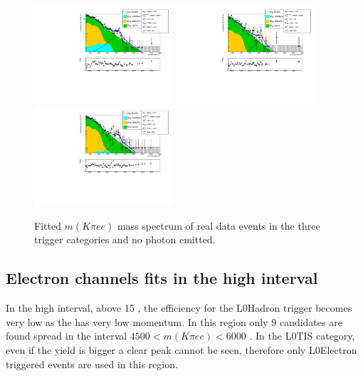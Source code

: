 \begin{figure}[h!]
\centering
\includegraphics[width=0.46\textwidth]{RKst/figs/fit_EEs_0_EE-q2central-gmc/KstEE_L0E_log_fitAndRes.pdf}
\includegraphics[width=0.46\textwidth]{RKst/figs/fit_EEs_0_EE-q2central-gmc/KstEE_L0H_log_fitAndRes.pdf}
\includegraphics[width=0.46\textwidth]{RKst/figs/fit_EEs_0_EE-q2central-gmc/KstEE_L0I_log_fitAndRes.pdf}
\caption{Fitted $m(K\pi ee)$ mass spectrum of \BdKstee real data events in the three trigger categories and no photon emitted. }
\label{fig:FitEE_Data_inTrigCat}
\end{figure}


\subsection{Electron channels fits in the high \qsq interval}

In the high \qsq interval, above 15 \gevgevcccc, the efficiency for the
L0Hadron trigger becomes very low as the \Kstar has very low momentum.
In this region only 9 candidates are found spread in the interval
$4500 < m(K\pi ee) < 6000$ \mevcc. In the L0TIS category,
even if the yield is bigger a clear peak cannot be seen, therefore
only L0Electron triggered events are used in this region.

